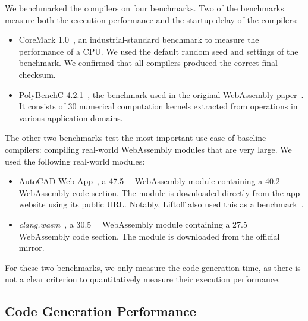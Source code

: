 \documentclass[acmsmall,nonacm,screen]{acmart}\settopmatter{printfolios=true,printccs=true,printacmref=false}
\begin{document}
We benchmarked the compilers on four benchmarks. Two of the benchmarks measure both the execution performance and the startup delay of the compilers: 
\begin{itemize}
    \item CoreMark 1.0~\cite{coremark}, an industrial-standard benchmark to measure the performance of a CPU. We used the default random seed and settings of the benchmark. We confirmed that all compilers produced the correct final checksum.
    \item PolyBenchC 4.2.1~\cite{polybenchc}, the benchmark used in the original WebAssembly paper~\cite{wasmPaper}. It consists of 30 numerical computation kernels extracted from operations in various application domains.
\end{itemize} 
The other two benchmarks test the most important use case of baseline compilers: compiling real-world WebAssembly modules that are very large. We used the following real-world modules:
\begin{itemize}
    \item AutoCAD Web App~\cite{autocadWebApp}, a \SI{47.5}{\mega\byte} WebAssembly module containing a \SI{40.2}{\mega\byte} WebAssembly code section. The module is downloaded directly from the app website using its public URL. Notably, Liftoff also used this as a benchmark~\cite{liftoffBlog}.
    \item \textit{clang.wasm}~\cite{clangDotWasm}, a \SI{30.5}{\mega\byte} WebAssembly module containing a \SI{27.5}{\mega\byte} WebAssembly code section. The module is downloaded from the official mirror.
\end{itemize} 
For these two benchmarks, we only measure the code generation time, as there is not a clear criterion to quantitatively measure their execution performance. 


\subsection{Code Generation Performance}
\end{document}
